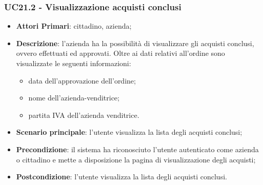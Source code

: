 \subsubsection{UC21.2 - Visualizzazione acquisti conclusi}
\begin{itemize}
	\item \textbf{Attori Primari}: cittadino, azienda;
	\item \textbf{Descrizione}: l'azienda ha la possibilità di visualizzare gli acquisti conclusi, ovvero effettuati ed approvati. Oltre ai dati relativi all'ordine sono visualizzate le seguenti informazioni:
	\begin{itemize}
		\item data dell'approvazione dell'ordine;
		\item nome dell'azienda-venditrice;
		\item partita IVA dell'azienda venditrice.
	\end{itemize}
	\item \textbf{Scenario principale}: l'utente visualizza la lista degli acquisti conclusi;
	\item \textbf{Precondizione}: il sistema ha riconosciuto l'utente autenticato come azienda o cittadino e
	mette a disposizione la pagina di visualizzazione degli acquisti;
	\item \textbf{Postcondizione}: l'utente visualizza la lista degli acquisti conclusi.
\end{itemize}

